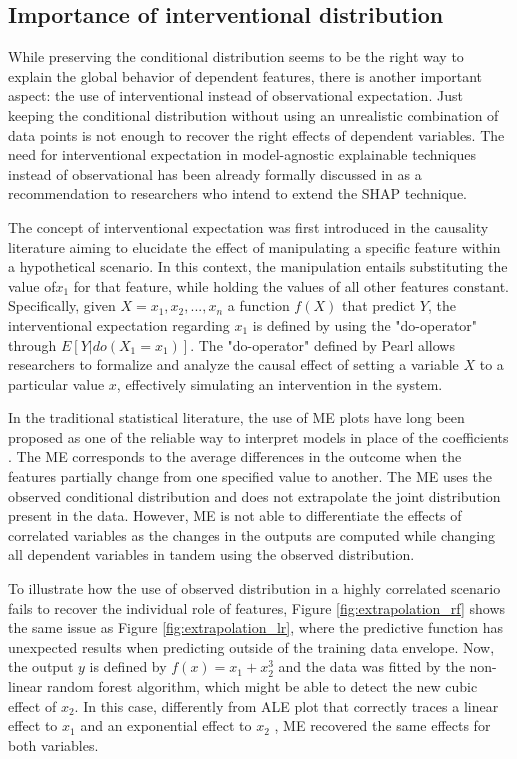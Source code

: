
\subsection{Importance of interventional distribution}
\label{intervention}

While preserving the conditional distribution seems to be the right way to explain the global behavior of dependent features, there is another important aspect: the use of interventional instead of observational expectation. Just keeping the conditional distribution without using an unrealistic combination of data points is not enough to recover the right effects of dependent variables. The need for interventional expectation in model-agnostic explainable techniques instead of observational has been already formally discussed in \cite{Janzing2020FeatureProblem} as a recommendation to researchers who intend to extend the \gls{SHAP} technique. 

The concept of interventional expectation was first introduced in the causality literature \cite{Pearl1993BayesianIntervention} aiming to elucidate the effect of manipulating a specific feature within a hypothetical scenario. In this context, the manipulation entails substituting the value of$x_1$ for that feature, while holding the values of all other features constant. Specifically, given $X={x_1, x_2,...,x_n}$ a function $f(X)$ that predict $Y$, the interventional expectation regarding $x_1$ is defined by using the "do-operator" through \(E[Y | do(X_{1} = x_{1})]\). The "do-operator" defined by Pearl allows researchers to formalize and analyze the causal effect of setting a variable \(X\) to a particular value \(x\), effectively simulating an intervention in the system.  

In the traditional statistical literature, the use of \gls{ME} plots have long been proposed as one of the reliable way to interpret models in place of the coefficients \cite{long1997regression}. The \gls{ME} corresponds to the average differences in the outcome when the features partially change from one speciﬁed value to another. The \gls{ME} uses the observed conditional distribution and does not extrapolate the joint distribution present in the data. However, \gls{ME} is not able to differentiate the effects of correlated variables as the changes in the outputs are computed while changing all dependent variables in tandem using the observed distribution.

To illustrate how the use of observed distribution in a highly correlated scenario fails to recover the individual role of features, Figure \ref{fig:extrapolation_rf} shows the same issue as Figure \ref{fig:extrapolation_lr}, where the predictive function has unexpected results when predicting outside of the training data envelope. Now, the output $y$ is defined by $f(x) = x_1 + x_2^3$ and the data was fitted by the non-linear random forest algorithm, which might be able to detect the new cubic effect of $x_2$. In this case, differently from \gls{ALE} plot that correctly traces a linear effect to $x_1$ and an exponential effect to $x_2$ , \gls{ME} recovered the same effects for both variables. 

